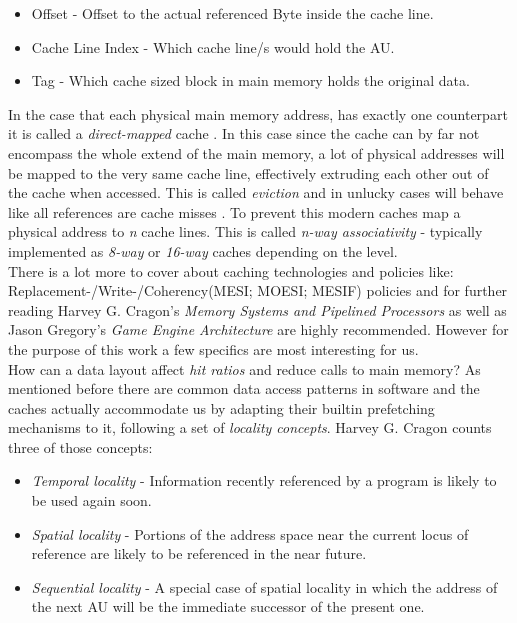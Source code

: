 \begin{itemize}
	\item Offset - Offset to the actual referenced Byte inside the cache line.
	\item Cache Line Index - Which cache line/s would hold the AU.
	\item Tag - Which cache sized block in main memory holds the original data.
\end{itemize}
In the case that each physical main memory address, has exactly one counterpart it is called a \textit{direct-mapped} cache . In this case since the cache can by far not encompass the whole extend of the main memory, a lot of physical addresses will be mapped to the very same cache line, effectively extruding each other out of the cache when accessed. This is called \textit{eviction} and in unlucky cases will behave like all references are cache misses . To prevent this modern caches map a physical address to \textit{n} cache lines. This is called \textit{n-way associativity} - typically implemented as \textit{8-way} or \textit{16-way} caches depending on the level.\\
There is a lot more to cover about caching technologies and policies like: Replacement-/Write-/Coherency(MESI; MOESI; MESIF) policies and for further reading Harvey G. Cragon's \textit{Memory Systems and Pipelined Processors} as well as Jason Gregory's \textit{Game Engine Architecture} are highly recommended. However for the purpose of this work a few specifics are most interesting for us.\\
How can a data layout affect \textit{hit ratios} and reduce calls to main memory? As mentioned before there are common data access patterns in software and the caches actually accommodate us by adapting their builtin prefetching mechanisms to it, following a set of \textit{locality concepts}. Harvey G. Cragon counts three of those concepts: 
\begin{itemize}
	\item \textit{Temporal locality} - Information recently referenced by a program is likely to be used again soon.
	\item \textit{Spatial locality} - Portions of the address space near the current locus of reference are likely to be referenced in the near future.
	\item \textit{Sequential locality} - A special case of spatial locality in which the address of the next AU will be the immediate successor of the present one.
\end{itemize}
